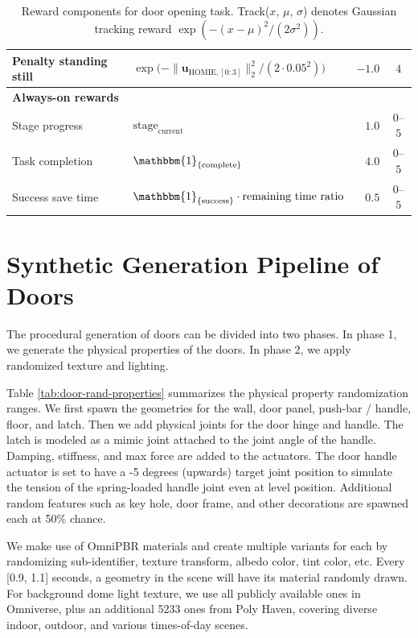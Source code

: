 \begin{table}[t]
\begin{tabular}{l l r c}
Penalty standing still
  & $\exp\bigl(-\|\mathbf{u}_{\text{HOMIE},[0:3]}\|_2^{2}/(2\cdot 0.05^{2})\bigr)$
  & $-1.0$ & $4$ \\

\midrule
\multicolumn{4}{l}{\textbf{Always-on rewards}} \\

Stage progress
  & $\text{stage}_{\text{current}}$
  & $1.0$ & $0$--$5$ \\

Task completion
  & $\mathbbm{1}_{\{\text{complete}\}}$
  & $4.0$ & $0$--$5$ \\

Success save time
  & $\mathbbm{1}_{\{\text{success}\}}\cdot\text{remaining time ratio}$
  & $0.5$ & $0$--$5$ \\

\bottomrule
\end{tabular}
\caption{Reward components for door opening task.  Track($x$, $\mu$, $\sigma$) denotes Gaussian tracking reward $\exp(-(x-\mu)^2/(2\sigma^2))$.}
\label{tab:door-opening-rewards}
\end{table}

\section{Synthetic Generation Pipeline of Doors}
\label{app:door}

The procedural generation of doors can be divided into two phases. In phase 1, we generate the physical properties of the doors. In phase 2, we apply randomized texture and lighting.

Table \ref{tab:door-rand-properties} summarizes the physical property randomization ranges. We first spawn the geometries for the wall, door panel, push-bar / handle, floor, and latch. Then we add physical joints for the door hinge and handle. The latch is modeled as a mimic joint attached to the joint angle of the handle. Damping, stiffness, and max force are added to the actuators. The door handle actuator is set to have a -5 degrees (upwards) target joint position to simulate the tension of the spring-loaded handle joint even at level position. Additional random features such as key hole, door frame, and other decorations are spawned each at 50\% chance.

We make use of OmniPBR materials and create multiple variants for each by randomizing sub-identifier, texture transform, albedo color, tint color, etc. Every [0.9, 1.1] seconds, a geometry in the scene will have its material randomly drawn. For background dome light texture, we use all publicly available ones in Omniverse, plus an additional 5233 ones from Poly Haven, covering diverse indoor, outdoor, and various times-of-day scenes.

